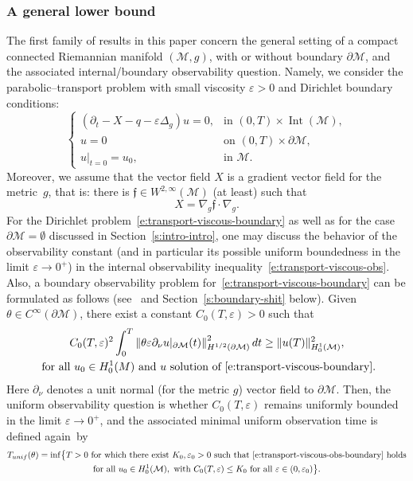 \documentclass[11pt]{article}
\numberwithin{equation}{section}
\newcommand{\unif}{\textup{unif}}
\theoremstyle{definition}
\newcommand{\M}{\ensuremath{\mathcal M}}
\newcommand{\f}{\ensuremath{\mathfrak{f}}}
\DeclareMathOperator{\Int}{Int}
\newcommand\nor[2]{\left\|#1\right\|_{#2}}
\let\d\partial
\let\eps\varepsilon
\let\q q
\begin{document}
\subsubsection{A general lower bound}
\label{s:sect-general}
The first family of results in this paper concern the general setting of a compact connected Riemannian manifold $(\M,g)$, with or without boundary $\d\M$, and the associated internal/boundary observability question. Namely, we consider the parabolic--transport problem with small viscosity $\eps>0$ and Dirichlet boundary conditions:
\begin{equation}
\label{e:transport-viscous-boundary}
\begin{cases}
(\d_t - X -\q - \eps \Delta_g ) u = 0, & \text{in } (0,T)\times\Int(\M), \\
u = 0 & \text{on } (0,T)\times \d\M, \\
u|_{t=0} = u_0, & \text{in } \M.
\end{cases}
\end{equation}
Moreover, we assume that the vector field $X$ is a gradient vector field for the metric~$g$, that is: there is $\f \in W^{2,\infty}(\M)$ (at least) such that
\[
X = \nabla_g \f \cdot \nabla_g.
\]
For the Dirichlet problem~\eqref{e:transport-viscous-boundary} as well as for the case $\d\M =\emptyset$ discussed in Section~\ref{s:intro-intro}, one may discuss the behavior of the observability constant (and in particular its possible uniform boundedness in the limit $\eps\to 0^+$) in the internal observability inequality~\eqref{e:transport-viscous-obs}.
Also, a boundary observability problem for~\eqref{e:transport-viscous-boundary} can be formulated as follows (see~\cite{GL:07} and Section~\ref{s:boundary-shit} below). Given $\theta \in C^\infty(\d\M)$, there exist a constant $C_0(T,\eps)>0$ such that
\begin{multline}
\label{e:transport-viscous-obs-boundary}
C_0(T,\eps)^2 \int_0^T\nor{ \theta \eps \d_{\nu} u|_{\d\M}(t)}{H^{1/2}(\d\M)}^2 dt \geq \|u (T)\|_{H^1_0(\M)}^2, \\
\text{ for all } u_0 \in H^1_0(M) \text{ and } u \text{ solution of~\eqref{e:transport-viscous-boundary}}.
\end{multline}
Here $\d_\nu$ denotes a unit normal (for the metric $g$) vector field to $\d\M$.
Then, the uniform observability question is whether $C_0(T,\eps)$ remains uniformly bounded in the limit $\eps\to 0^+$, and the associated minimal uniform observation time is defined again~by
\begin{multline*}
T_{\unif}(\theta) = \inf \bigl\{ T >0 \text{ for which there exist }K_0, \eps_0>0 \text{ such that~\eqref{e:transport-viscous-obs-boundary} holds}\\
\text {for all }u_0\in H^1_0(\M), \text{ with }C_0(T,\eps)\leq K_0 \text{ for all } \eps \in (0,\eps_0) \bigr\}.
\end{multline*}
\end{document}
